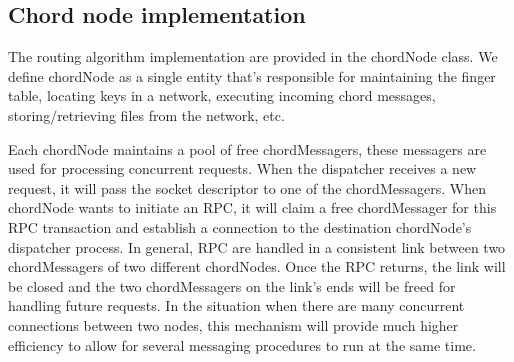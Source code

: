 \documentclass[letterpaper,twocolumn,10pt]{article}
\begin{document}
\subsection{Chord node implementation}

The routing algorithm implementation are provided in the chordNode class. We define chordNode as a single entity that's responsible for maintaining the finger table, locating keys in a network, executing incoming chord messages, storing/retrieving files from the network, etc. 

Each chordNode maintains a pool of free chordMessagers, these messagers are used for processing concurrent requests. When the dispatcher receives a new request, it will pass the socket descriptor to one of the chordMessagers. When chordNode wants to initiate an RPC, it will claim a free chordMessager for this RPC transaction and establish a connection to the destination chordNode's dispatcher process. In general, RPC are handled in a consistent link between two chordMessagers of two different chordNodes. Once the RPC returns, the link will be closed and the two chordMessagers on the link's ends will be freed for handling future requests. In the situation when there are many concurrent connections between two nodes, this mechanism will provide much higher efficiency to allow for several messaging procedures to run at the same time.
\end{document}
